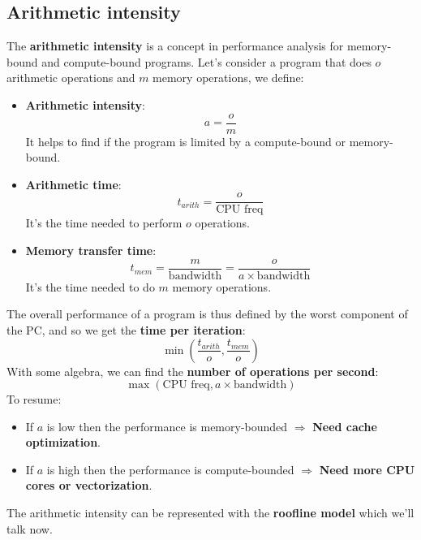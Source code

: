 \documentclass[12pt, openany]{report}
\theoremstyle{definition}
\begin{document}
\subsection{Arithmetic intensity}
The \textbf{arithmetic intensity} is a concept in performance analysis for memory-bound and compute-bound programs.
Let's consider a program that does $o$ arithmetic operations and $m$ memory operations, we define:
\begin{itemize}
	\item \textbf{Arithmetic intensity}: 
	\begin{equation} 
		a = \frac{o}{m}
	\end{equation}
	It helps to find if the program is limited by a compute-bound or memory-bound.
	\item \textbf{Arithmetic time}: 
	\begin{equation} 
		t_{arith} = \frac{o}{\text{CPU freq}}
	\end{equation}
	It's the time needed to perform $o$ operations.
	\item \textbf{Memory transfer time}:
	\begin{equation} 
		t_{mem} = \frac{m}{\text{bandwidth}} = \frac{o}{a \times \text{bandwidth}}
	\end{equation}
	It's the time needed to do $m$ memory operations. 
\end{itemize}
The overall performance of a program is thus defined by the worst component of the PC, and so we get the \textbf{time per iteration}:
\begin{equation}
	\min \left( \frac{t_{arith}}{o},\frac{t_{mem}}{o} \right)
\end{equation}
With some algebra, we can find the \textbf{number of operations per second}:
\begin{equation}
	\max \left( \text{CPU freq}, a \times \text{bandwidth} \right)
\end{equation}
To resume:
\begin{itemize}
	\item If $a$ is low then the performance is memory-bounded $\Rightarrow$ \textbf{Need cache optimization}.
	\item If $a$ is high then the performance is compute-bounded $\Rightarrow$ \textbf{Need more CPU cores or vectorization}.
\end{itemize}
The arithmetic intensity can be represented with the \textbf{roofline model} which we'll talk now.
\newpage
\end{document}

